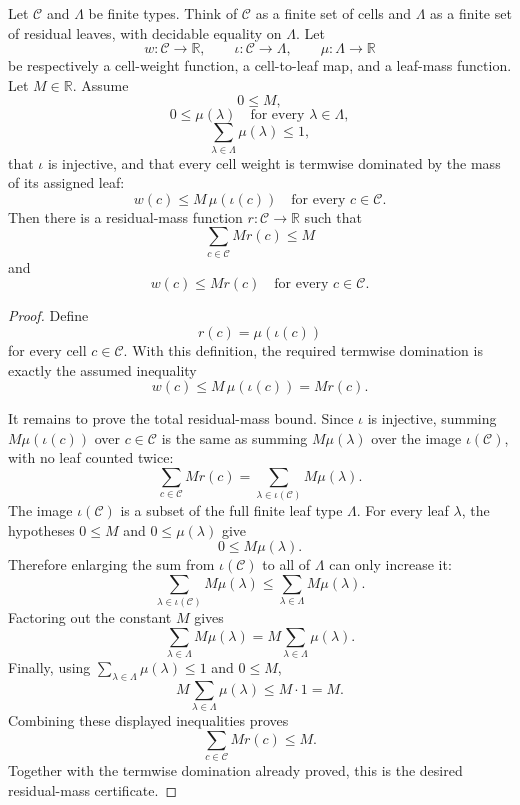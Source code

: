 \begin{helper}
Let \(\mathcal C\) and \(\Lambda\) be finite types.  Think of
\(\mathcal C\) as a finite set of cells and \(\Lambda\) as a finite set of
residual leaves, with decidable equality on \(\Lambda\).  Let
\[
w:\mathcal C\to\mathbb R,\qquad
\iota:\mathcal C\to\Lambda,\qquad
\mu:\Lambda\to\mathbb R
\]
be respectively a cell-weight function, a cell-to-leaf map, and a leaf-mass
function.  Let \(M\in\mathbb R\).  Assume
\[
0\le M,
\]
\[
0\le \mu(\lambda)\quad\text{for every }\lambda\in\Lambda,
\]
\[
\sum_{\lambda\in\Lambda}\mu(\lambda)\le1,
\]
that \(\iota\) is injective, and that every cell weight is termwise dominated
by the mass of its assigned leaf:
\[
w(c)\le M\,\mu(\iota(c))
\quad\text{for every }c\in\mathcal C.
\]
Then there is a residual-mass function \(r:\mathcal C\to\mathbb R\) such
that
\[
\sum_{c\in\mathcal C} M r(c)\le M
\]
and
\[
w(c)\le M r(c)
\quad\text{for every }c\in\mathcal C.
\]
\end{helper}
\begin{proof}
Define
\[
r(c)=\mu(\iota(c))
\]
for every cell \(c\in\mathcal C\).  With this definition, the required
termwise domination is exactly the assumed inequality
\[
w(c)\le M\,\mu(\iota(c))=M r(c).
\]

It remains to prove the total residual-mass bound.  Since \(\iota\) is
injective, summing \(M\mu(\iota(c))\) over \(c\in\mathcal C\) is the same as
summing \(M\mu(\lambda)\) over the image \(\iota(\mathcal C)\), with no
leaf counted twice:
\[
\sum_{c\in\mathcal C} M r(c)
=
\sum_{\lambda\in\iota(\mathcal C)} M\mu(\lambda).
\]
The image \(\iota(\mathcal C)\) is a subset of the full finite leaf type
\(\Lambda\).  For every leaf \(\lambda\), the hypotheses \(0\le M\) and
\(0\le\mu(\lambda)\) give
\[
0\le M\mu(\lambda).
\]
Therefore enlarging the sum from \(\iota(\mathcal C)\) to all of
\(\Lambda\) can only increase it:
\[
\sum_{\lambda\in\iota(\mathcal C)} M\mu(\lambda)
\le
\sum_{\lambda\in\Lambda} M\mu(\lambda).
\]
Factoring out the constant \(M\) gives
\[
\sum_{\lambda\in\Lambda} M\mu(\lambda)
=
M\sum_{\lambda\in\Lambda}\mu(\lambda).
\]
Finally, using \(\sum_{\lambda\in\Lambda}\mu(\lambda)\le1\) and
\(0\le M\),
\[
M\sum_{\lambda\in\Lambda}\mu(\lambda)\le M\cdot1=M.
\]
Combining these displayed inequalities proves
\[
\sum_{c\in\mathcal C} M r(c)\le M.
\]
Together with the termwise domination already proved, this is the desired
residual-mass certificate.
\end{proof}

